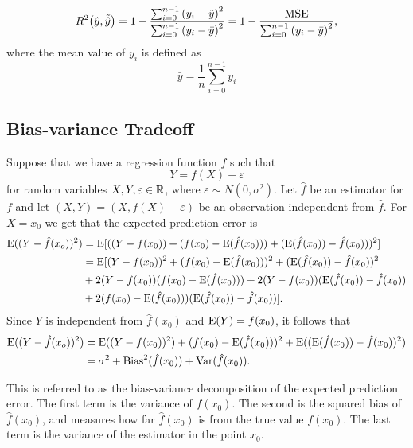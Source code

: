 \begin{equation}\label{eq:R2}
    R^2 \qty(\hat{y}, \Tilde{\hat{y}}) = 1 - \frac{\sum_{i=0}^{n-1} \qty(y_i - \Tilde{y})^2 }{\sum_{i=0}^{n-1} \qty(y_i - \bar{y})^2} = 1 - \frac{\mathrm{MSE} }{\sum_{i=0}^{n-1} \qty(y_i - \bar{y})^2},
\end{equation}
where the mean value of $y_i$ is defined as
\begin{equation*}
    \bar{y} = \frac{1}{n} \sum_{i=0}^{n-1} y_i
\end{equation*}


\subsection{Bias-variance Tradeoff}\label{sec:Bias-var theory}
Suppose that we have a regression function $f$ such that
\begin{equation*}
    Y = f(X) + \varepsilon
\end{equation*}
for random variables $X,Y,\varepsilon\in\mathbb{R}$, where $\varepsilon\sim N(0,\sigma^2)$. Let $\hat{f}$ be an estimator for $f$ and let $(X,Y)=(X,f(X)+\varepsilon)$ be an observation independent from $\hat{f}$. For $X=x_0$ we get that the expected prediction error is
\begin{align*}
    \mathrm{E}((Y-\hat{f}(x_o))^2) &= \mathrm{E}[((Y-f(x_0)) + (f(x_0) - \mathrm{E}(\hat{f}(x_0))) + (\mathrm{E}(\hat{f}(x_0)) -\hat{f}(x_0)))^2]\\ &= \mathrm{E}[(Y-f(x_0))^2+(f(x_0)-\mathrm{E}(\hat{f}(x_0)))^2 + (\mathrm{E}(\hat{f}(x_0))-\hat{f}(x_0))^2\\& + 2(Y-f(x_0))(f(x_0)-\mathrm{E}(\hat{f}(x_0))) + 2(Y-f(x_0))(\mathrm{E}(\hat{f}(x_0))-\hat{f}(x_0)) \\&+ 2(f(x_0)-\mathrm{E}(\hat{f}(x_0)))(\mathrm{E}(\hat{f}(x_0))-\hat{f}(x_0))].
\end{align*}
Since $Y$ is independent from $\hat{f}(x_0)$ and $\mathrm{E}(Y)=f(x_0)$, it follows that
\begin{align*}
    \mathrm{E}((Y-\hat{f}(x_o))^2) &= \mathrm{E}((Y-f(x_0))^2) + (f(x_0)-\mathrm{E}(\hat{f}(x_0)))^2 + \mathrm{E}((\mathrm{E}(\hat{f}(x_0))-\hat{f}(x_0))^2) \\&= \sigma^2 + \mathrm{Bias}^2(\hat{f}(x_0)) + \mathrm{Var}(\hat{f}(x_0)).
\end{align*}

This is referred to as the bias-variance decomposition of the expected prediction error. The first term is the variance of $f(x_0)$. The second is the squared bias of $\hat{f}(x_0)$, and measures how far $\hat{f}(x_0)$ is from the true value $f(x_0)$. The last term is the variance of the estimator in the point $x_0$.

